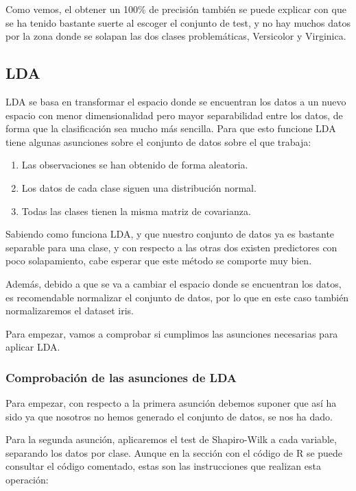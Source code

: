 Como vemos, el obtener un 100\% de precisión también se puede explicar con que se ha tenido bastante suerte al escoger el conjunto de test, y no hay muchos datos por la zona donde se solapan las dos clases problemáticas, Versicolor y Virginica.

\newpage

\subsection{LDA}

LDA se basa en transformar el espacio donde se encuentran los datos a un nuevo espacio con menor dimensionalidad pero mayor separabilidad entre los datos, de forma que la clasificación sea mucho más sencilla. Para que esto funcione LDA tiene algunas asunciones sobre el conjunto de datos sobre el que trabaja:

\begin{enumerate}
	\item Las observaciones se han obtenido de forma aleatoria.
	\item Los datos de cada clase siguen una distribución normal.
	\item Todas las clases tienen la misma matriz de covarianza.
\end{enumerate}

Sabiendo como funciona LDA, y que nuestro conjunto de datos ya es bastante separable para una clase, y con respecto a las otras dos existen predictores con poco solapamiento, cabe esperar que este método se comporte muy bien.

Además, debido a que se va a cambiar el espacio donde se encuentran los datos, es recomendable normalizar el conjunto de datos, por lo que en este caso también normalizaremos el dataset iris.

Para empezar, vamos a comprobar si cumplimos las asunciones necesarias para aplicar LDA.

\subsubsection{Comprobación de las asunciones de LDA}

Para empezar, con respecto a la primera asunción debemos suponer que así ha sido ya que nosotros no hemos generado el conjunto de datos, se nos ha dado.

Para la segunda asunción, aplicaremos el test de Shapiro-Wilk a cada variable, separando los datos por clase. Aunque en la sección con el código de R se puede consultar el código comentado, estas son las instrucciones que realizan esta operación:

